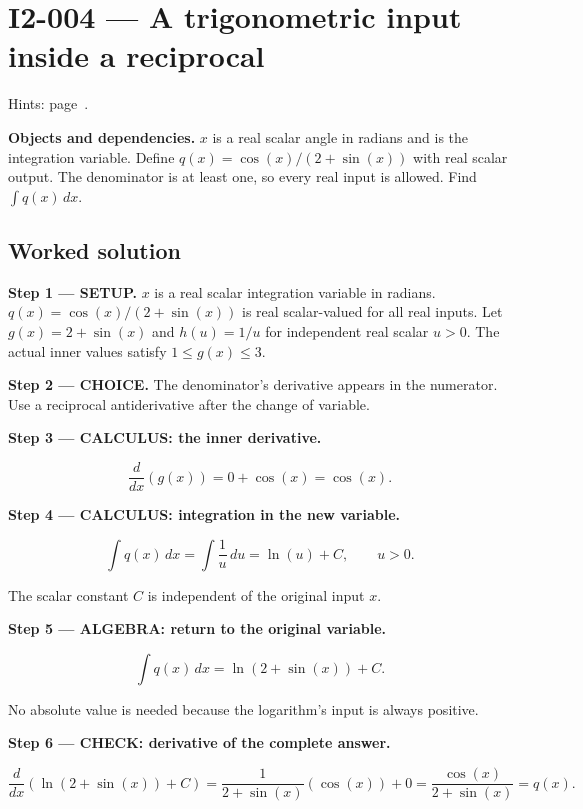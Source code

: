 \documentclass[11pt,oneside,openany]{book}
\begin{document}
\section{I2-004 --- A trigonometric input inside a reciprocal}
\label{problem:I2-004}
{\small Hints: page~\pageref{hints:I2-004}.}\par\medskip

\textbf{Objects and dependencies.} \(x\) is a real scalar angle in radians and is the
integration variable. Define \(q(x)=\cos(x)/(2+\sin(x))\) with real scalar output.
The denominator is at least one, so every real input is allowed. Find
\(\int q(x)\,dx\).
\subsection*{Worked solution}

\textbf{Step 1 --- SETUP.} \(x\) is a real scalar integration variable in radians.
\(q(x)=\cos(x)/(2+\sin(x))\) is real scalar-valued for all real inputs.
Let \(g(x)=2+\sin(x)\) and \(h(u)=1/u\) for independent real scalar \(u>0\).
The actual inner values satisfy \(1\le g(x)\le3\).

\begin{ChoiceStep}
\textbf{Step 2 --- CHOICE.} The denominator's derivative appears in the numerator.
Use a reciprocal antiderivative after the change of variable.

\end{ChoiceStep}
\textbf{Step 3 --- CALCULUS: the inner derivative.}

\[
\frac{d}{dx}\left(g(x)\right)=0+\cos(x)=\cos(x).
\]

\textbf{Step 4 --- CALCULUS: integration in the new variable.}

\[
\int q(x)\,dx=\int\frac1u\,du=\ln(u)+C,\qquad u>0.
\]

The scalar constant \(C\) is independent of the original input \(x\).

\begingroup\color{AlgebraBlue}
\textbf{Step 5 --- ALGEBRA: return to the original variable.}

\[
\int q(x)\,dx=\ln(2+\sin(x))+C.
\]

No absolute value is needed because the logarithm's input is always positive.

\endgroup
\textbf{Step 6 --- CHECK: derivative of the complete answer.}

\[
\frac{d}{dx}\left(\ln(2+\sin(x))+C\right)
=\frac1{2+\sin(x)}(\cos(x))+0
=\frac{\cos(x)}{2+\sin(x)}=q(x).
\]
\end{document}
